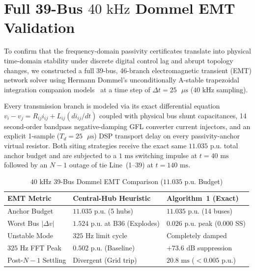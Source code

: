 \documentclass[10pt,twocolumn]{article}
\begin{document}
\section{Full 39-Bus $40\text{ kHz}$ Dommel EMT Validation}
To confirm that the frequency-domain passivity certificates translate into physical time-domain stability under discrete digital control lag and abrupt topology changes, we constructed a full 39-bus, 46-branch electromagnetic transient (EMT) network solver using Hermann Dommel's unconditionally A-stable trapezoidal integration companion models~\cite{dommel1969digital} at a time step of $\Delta t=25\text{ }\mu\text{s}$ ($40\text{ kHz}$ sampling).

Every transmission branch is modeled via its exact differential equation $v_i - v_j = R_{ij}i_{ij} + L_{ij}(di_{ij}/dt)$ coupled with physical bus shunt capacitances, 14 second-order bandpass negative-damping GFL converter current injectors, and an explicit 1-sample ($T_d=25\text{ }\mu\text{s}$) DSP transport delay on every passivity-anchor virtual resistor. Both siting strategies receive the exact same $11.035\text{ p.u.}$ total anchor budget and are subjected to a $1\text{ ms}$ switching impulse at $t=40\text{ ms}$ followed by an $N-1$ outage of tie Line~(1--39) at $t=140\text{ ms}$.

\begin{table}[t]
\centering
\caption{$40\text{ kHz}$ 39-Bus Dommel EMT Comparison ($11.035\text{ p.u.}$ Budget)}
\label{tab:emt}
\scriptsize
\setlength{\tabcolsep}{3.5pt}
\begin{tabular}{@{}p{}p{}p{}@{}}
\toprule
\textbf{EMT Metric} & \textbf{Central-Hub Heuristic} & \textbf{Algorithm~1 (Exact)} \\
\midrule
Anchor Budget & $11.035\text{ p.u.}$ (5 hubs) & $11.035\text{ p.u.}$ (14 buses) \\
Worst Bus $|\Delta v|$ & $1.524\text{ p.u.}$ at B36 (Explodes) & $0.026\text{ p.u.}$ peak ($0.000$ SS) \\
Unstable Mode & $325\text{ Hz}$ limit cycle & Completely damped \\
$325\text{ Hz}$ FFT Peak & $0.502\text{ p.u.}$ (Baseline) & $+73.6\text{ dB}$ suppression \\
Post-$N-1$ Settling & Divergent (Grid trip) & $20.8\text{ ms}$ ($<0.005\text{ p.u.}$) \\
\bottomrule
\end{tabular}
\end{table}
\end{document}
